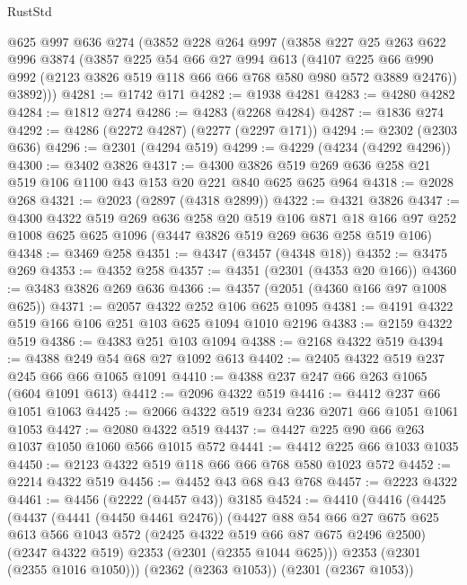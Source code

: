 \begin{lexlean}{RustStd}
\begin{coremodule}
    @625
    @997
    @636
    @274
    (@3852
      @228
      @264
      @997
      (@3858
        @227
        @25
        @263
        @622
        @996
        @3874
        (@3857
          @225
          @54
          @66
          @27
          @994
          @613
          (@4107 @225 @66 @990 @992 (@2123 @3826 @519 @118 @66 @66 @768 @580 @980 @572 @3889 @2476))
          @3892)))
@4281 := @1742 @171
@4282 := @1938 @4281
@4283 := @4280 @4282
@4284 := @1812 @274
@4286 := @4283 (@2268 @4284)
@4287 := @1836 @274
@4292 := @4286 (@2272 @4287) (@2277 (@2297 @171))
@4294 := @2302 (@2303 @636)
@4296 := @2301 (@4294 @519)
@4299 := @4229 (@4234 (@4292 @4296))
@4300 := @3402 @3826
@4317 := @4300 @3826 @519 @269 @636 @258 @21 @519 @106 @1100 @43 @153 @20 @221 @840 @625 @625 @964
@4318 := @2028 @268
@4321 := @2023 (@2897 (@4318 @2899))
@4322 := @4321 @3826
@4347 := @4300
    @4322
    @519
    @269
    @636
    @258
    @20
    @519
    @106
    @871
    @18
    @166
    @97
    @252
    @1008
    @625
    @625
    @1096
    (@3447 @3826 @519 @269 @636 @258 @519 @106)
@4348 := @3469 @258
@4351 := @4347 (@3457 (@4348 @18))
@4352 := @3475 @269
@4353 := @4352 @258
@4357 := @4351 (@2301 (@4353 @20 @166))
@4360 := @3483 @3826 @269 @636
@4366 := @4357 (@2051 (@4360 @166 @97 @1008 @625))
@4371 := @2057 @4322 @252 @106 @625 @1095
@4381 := @4191 @4322 @519 @166 @106 @251 @103 @625 @1094 @1010 @2196
@4383 := @2159 @4322 @519
@4386 := @4383 @251 @103 @1094
@4388 := @2168 @4322 @519
@4394 := @4388 @249 @54 @68 @27 @1092 @613
@4402 := @2405 @4322 @519 @237 @245 @66 @66 @1065 @1091
@4410 := @4388 @237 @247 @66 @263 @1065 (@604 @1091 @613)
@4412 := @2096 @4322 @519
@4416 := @4412 @237 @66 @1051 @1063
@4425 := @2066 @4322 @519 @234 @236 @2071 @66 @1051 @1061 @1053
@4427 := @2080 @4322 @519
@4437 := @4427 @225 @90 @66 @263 @1037 @1050 @1060 @566 @1015 @572
@4441 := @4412 @225 @66 @1033 @1035
@4450 := @2123 @4322 @519 @118 @66 @66 @768 @580 @1023 @572
@4452 := @2214 @4322 @519
@4456 := @4452 @43 @68 @43 @768
@4457 := @2223 @4322
@4461 := @4456 (@2222 (@4457 @43)) @3185
@4524 := @4410
    (@4416
      (@4425
        (@4437
          (@4441 (@4450 @4461 @2476))
          (@4427
            @88
            @54
            @66
            @27
            @675
            @625
            @613
            @566
            @1043
            @572
            (@2425 @4322 @519 @66 @87 @675 @2496 @2500)
            (@2347 @4322 @519)
            @2353
            (@2301 (@2355 @1044 @625)))
          @2353
          (@2301 (@2355 @1016 @1050)))
        (@2362 (@2363 @1053))
        (@2301 (@2367 @1053))

\end{coremodule}
\end{lexlean}
